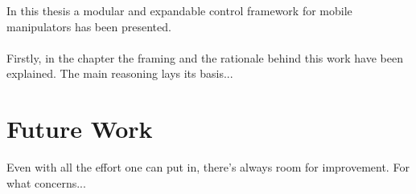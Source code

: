
\label{ch:conclusions}
In this thesis a modular and expandable control framework for mobile manipulators has been presented.

\paragraph{}
Firstly, in the \textit{} chapter the framing and the rationale behind this work have been explained. The main reasoning lays its basis...


\section*{Future Work}\label{sec:openproblems}
Even with all the effort one can put in, there's always room for improvement. For what concerns...

 
